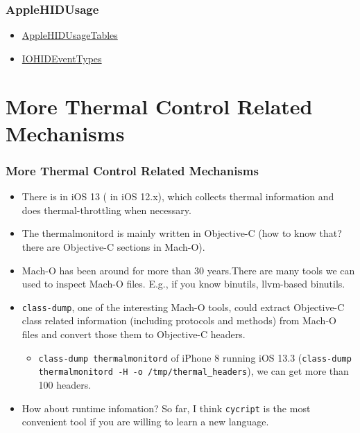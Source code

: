\documentclass{beamer}
\begin{document}
\begin{frame}
  \frametitle{AppleHIDUsage}
  \begin{itemize}
  \item \href{https://opensource.apple.com/source/IOHIDFamily/IOHIDFamily-701.60.2/IOHIDFamily/AppleHIDUsageTables.h.auto.html}{AppleHIDUsageTables}
    \item \href{https://opensource.apple.com/source/IOHIDFamily/IOHIDFamily-701.60.2/IOHIDFamily/IOHIDEventTypes.h.auto.html}{IOHIDEventTypes}
  \end{itemize}
\end{frame}

\section{More Thermal Control Related Mechanisms}
\begin{frame}[allowframebreaks]
  \frametitle{More Thermal Control Related Mechanisms}
  \begin{itemize}
  \item There is  in iOS 13 ( in iOS 12.x), which collects thermal information and does thermal-throttling when necessary.
  \item The thermalmonitord is mainly written in Objective-C (how to know that? there are Objective-C sections in Mach-O).
  \item Mach-O has been around for more than 30 years.There are many tools we can used to inspect Mach-O files. E.g., if you know binutils, llvm-based binutils.
  \item \texttt{class-dump}, one of the interesting Mach-O tools, could extract Objective-C class related information (including protocols and methods) from Mach-O files and convert those them to Objective-C headers.
    \begin{itemize}
    \item \texttt{class-dump thermalmonitord} of iPhone 8 running iOS 13.3 (\texttt{class-dump thermalmonitord -H -o /tmp/thermal\_headers}), we can get more than 100 headers.
    \end{itemize}
  \item How about runtime infomation? So far, I think \texttt{cycript} \cite{cycript} is the most convenient tool if you are willing to learn a new language.
  \end{itemize}
\end{frame}
\end{document}
